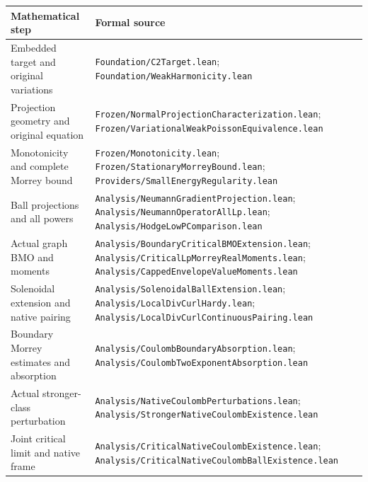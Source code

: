 \documentclass[11pt,a4paper]{article}
\numberwithin{equation}{section}
\theoremstyle{definition}
\theoremstyle{remark}
\newcommand{\lean}[1]{\nolinkurl{#1}}
\begin{document}
\small
\begin{longtable}{@{}>{\raggedright\arraybackslash}p{}>{\raggedright\arraybackslash}p{}@{}}
\toprule
Mathematical step & Formal source\\\midrule\endhead
Embedded target and original variations &
\lean{Foundation/C2Target.lean};\newline
\lean{Foundation/WeakHarmonicity.lean}\\
Projection geometry and original equation &
\lean{Frozen/NormalProjectionCharacterization.lean};\newline
\lean{Frozen/VariationalWeakPoissonEquivalence.lean}\\
Monotonicity and complete Morrey bound &
\lean{Frozen/Monotonicity.lean};\newline
\lean{Frozen/StationaryMorreyBound.lean};\newline
\lean{Providers/SmallEnergyRegularity.lean}\\
Ball projections and all powers &
\lean{Analysis/NeumannGradientProjection.lean};\newline
\lean{Analysis/NeumannOperatorAllLp.lean};\newline
\lean{Analysis/HodgeLowPComparison.lean}\\
Actual graph BMO and moments &
\lean{Analysis/BoundaryCriticalBMOExtension.lean};\newline
\lean{Analysis/CriticalLpMorreyRealMoments.lean};\newline
\lean{Analysis/CappedEnvelopeValueMoments.lean}\\
Solenoidal extension and native pairing &
\lean{Analysis/SolenoidalBallExtension.lean};\newline
\lean{Analysis/LocalDivCurlHardy.lean};\newline
\lean{Analysis/LocalDivCurlContinuousPairing.lean}\\
Boundary Morrey estimates and absorption &
\lean{Analysis/CoulombBoundaryAbsorption.lean};\newline
\lean{Analysis/CoulombTwoExponentAbsorption.lean}\\
Actual stronger-class perturbation &
\lean{Analysis/NativeCoulombPerturbations.lean};\newline
\lean{Analysis/StrongerNativeCoulombExistence.lean}\\
Joint critical limit and native frame &
\lean{Analysis/CriticalNativeCoulombExistence.lean};\newline
\lean{Analysis/CriticalNativeCoulombBallExistence.lean}\\

\end{longtable}
\end{document}
